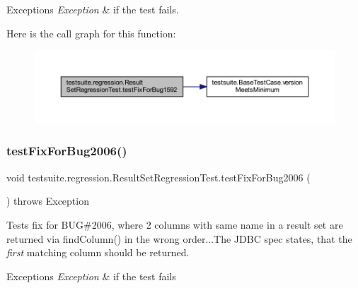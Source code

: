 \begin{DoxyExceptions}{Exceptions}
{\em Exception} & if the test fails. \\
\hline
\end{DoxyExceptions}
Here is the call graph for this function\+:
\nopagebreak
\begin{figure}[H]
\begin{center}
\leavevmode
\includegraphics[width=350pt]{classtestsuite_1_1regression_1_1_result_set_regression_test_af6f990a2b26f31cea60e13d460981d60_cgraph}
\end{center}
\end{figure}
\mbox{\label{classtestsuite_1_1regression_1_1_result_set_regression_test_a184ac9b80b5364945565206d87d9e797}} 
\subsubsection{\texorpdfstring{test\+Fix\+For\+Bug2006()}{testFixForBug2006()}}
{\footnotesize\ttfamily void testsuite.\+regression.\+Result\+Set\+Regression\+Test.\+test\+Fix\+For\+Bug2006 (\begin{DoxyParamCaption}{ }\end{DoxyParamCaption}) throws Exception}

Tests fix for B\+UG\#2006, where 2 columns with same name in a result set are returned via find\+Column() in the wrong order...The J\+D\+BC spec states, that the {\itshape first} matching column should be returned.


\begin{DoxyExceptions}{Exceptions}
{\em Exception} & if the test fails \\
\hline
\end{DoxyExceptions}
\mbox{\label{classtestsuite_1_1regression_1_1_result_set_regression_test_ad99758a5458b83ac934b1a347ae47e5a}} 
